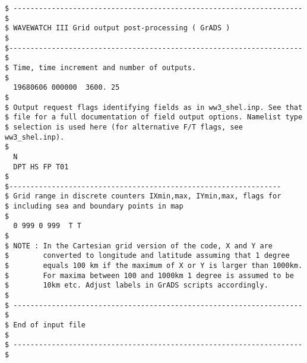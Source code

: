\begin{footnotesize}
\begin{verbatim}
$ -------------------------------------------------------------------- $
$ WAVEWATCH III Grid output post-processing ( GrADS )                  $
$--------------------------------------------------------------------- $
$ Time, time increment and number of outputs.
$
  19680606 000000  3600. 25
$
$ Output request flags identifying fields as in ww3_shel.inp. See that
$ file for a full documentation of field output options. Namelist type
$ selection is used here (for alternative F/T flags, see ww3_shel.inp).
$
  N
  DPT HS FP T01
$
$----------------------------------------------------------------
$ Grid range in discrete counters IXmin,max, IYmin,max, flags for
$ including sea and boundary points in map
$
  0 999 0 999  T T
$
$ NOTE : In the Cartesian grid version of the code, X and Y are
$        converted to longitude and latitude assuming that 1 degree
$        equals 100 km if the maximum of X or Y is larger than 1000km.
$        For maxima between 100 and 1000km 1 degree is assumed to be
$        10km etc. Adjust labels in GrADS scripts accordingly.
$
$ -------------------------------------------------------------------- $
$ End of input file                                                    $
$ -------------------------------------------------------------------- $
\end{verbatim}
\end{footnotesize}
